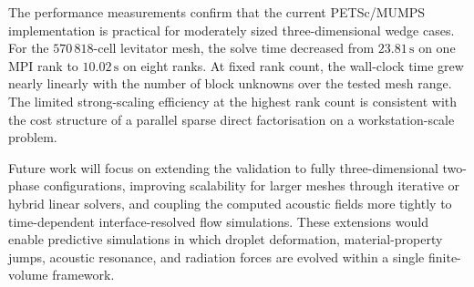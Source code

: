\documentclass[final,num,12pt]{elsarticle}
\begin{document}
The performance measurements confirm that the current PETSc/MUMPS
implementation is practical for moderately sized three-dimensional wedge cases.
For the $570\,818$-cell levitator mesh, the solve time decreased from
$23.81\,\mathrm{s}$ on one MPI rank to $10.02\,\mathrm{s}$ on eight ranks.  At
fixed rank count, the wall-clock time grew nearly linearly with the number of
block unknowns over the tested mesh range.  The limited strong-scaling
efficiency at the highest rank count is consistent with the cost structure of a
parallel sparse direct factorisation on a workstation-scale problem.

Future work will focus on extending the validation to fully three-dimensional
two-phase configurations, improving scalability for larger meshes through
iterative or hybrid linear solvers, and coupling the computed acoustic fields
more tightly to time-dependent interface-resolved flow simulations.  These
extensions would enable predictive simulations in which droplet deformation,
material-property jumps, acoustic resonance, and radiation forces are evolved
within a single finite-volume framework.




\end{document}
